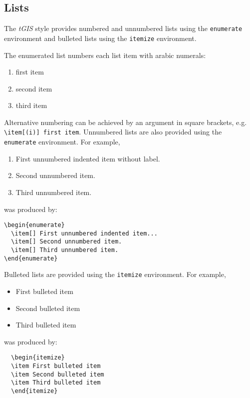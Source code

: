 \documentclass[]{tGIS2e}
\begin{document}
\subsection{Lists}

The {\it tGIS} style provides numbered and unnumbered lists using the {\tt enumerate} environment and bulleted
lists  using the {\tt itemize} environment.

The enumerated list numbers each list item with arabic numerals:
%
\begin{enumerate}
   \item first item
   \item second item
   \item third item
\end{enumerate}
%
Alternative numbering can be achieved by an argument in square brackets, e.g. \verb"\item[(i)] first item".
%
Unnumbered lists are also provided using the {\tt enumerate} environment.
For example,
\begin{enumerate}
   \item[] First unnumbered indented item without label.
   \item[] Second unnumbered item.
   \item[] Third unnumbered item.
\end{enumerate}
was produced by:
%
\begin{verbatim}
\begin{enumerate}
  \item[] First unnumbered indented item...
  \item[] Second unnumbered item.
  \item[] Third unnumbered item.
\end{enumerate}
\end{verbatim}
%
Bulleted lists are provided using the {\tt itemize} environment. For example,
\begin{itemize}
\item First bulleted item
\item Second bulleted item
\item Third bulleted item
\end{itemize}
was produced by:
\begin{verbatim}
  \begin{itemize}
  \item First bulleted item
  \item Second bulleted item
  \item Third bulleted item
  \end{itemize}
\end{verbatim}
\end{document}
